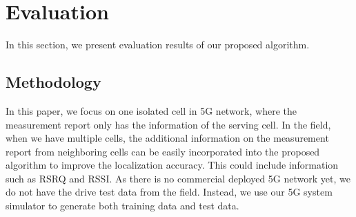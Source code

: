 \documentclass[conference, 10pt]{IEEEtran}
\begin{document}


\section{Evaluation}
\label{sec:eval}
In this section, we present evaluation results of our proposed algorithm. 
\subsection{Methodology}
In this paper, we focus on one isolated cell in 5G network, where the measurement report
only has the information of the serving cell. In the field, when we have multiple cells, the additional
information on the measurement report from neighboring cells can be easily incorporated into the proposed algorithm to improve the 
localization accuracy. This could include information such as RSRQ and RSSI. As there is no commercial deployed 5G network yet, we do not have the drive test data from the field.
Instead, we use our 5G system simulator to generate both training data and test data.
\end{document}
